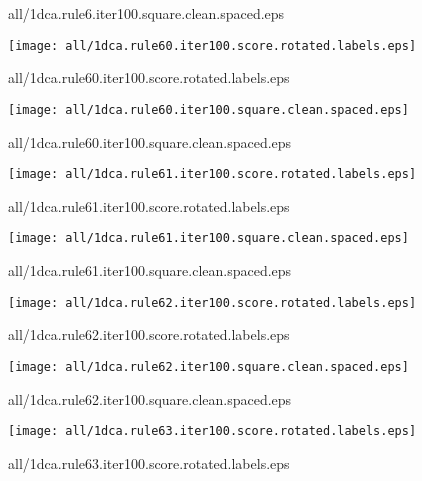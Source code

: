 \documentclass{article}
\begin{document}
{\footnotesize all/1dca.rule6.iter100.square.clean.spaced.eps}
\begin{center}
\begin{minipage}{\textwidth}
\texttt{[image: all/1dca.rule60.iter100.score.rotated.labels.eps]}
\end{minipage}
\end{center}
{\footnotesize all/1dca.rule60.iter100.score.rotated.labels.eps}
\begin{center}
\begin{minipage}{\textwidth}
\texttt{[image: all/1dca.rule60.iter100.square.clean.spaced.eps]}
\end{minipage}
\end{center}
{\footnotesize all/1dca.rule60.iter100.square.clean.spaced.eps}
\begin{center}
\begin{minipage}{\textwidth}
\texttt{[image: all/1dca.rule61.iter100.score.rotated.labels.eps]}
\end{minipage}
\end{center}
{\footnotesize all/1dca.rule61.iter100.score.rotated.labels.eps}
\begin{center}
\begin{minipage}{\textwidth}
\texttt{[image: all/1dca.rule61.iter100.square.clean.spaced.eps]}
\end{minipage}
\end{center}
{\footnotesize all/1dca.rule61.iter100.square.clean.spaced.eps}
\begin{center}
\begin{minipage}{\textwidth}
\texttt{[image: all/1dca.rule62.iter100.score.rotated.labels.eps]}
\end{minipage}
\end{center}
{\footnotesize all/1dca.rule62.iter100.score.rotated.labels.eps}
\begin{center}
\begin{minipage}{\textwidth}
\texttt{[image: all/1dca.rule62.iter100.square.clean.spaced.eps]}
\end{minipage}
\end{center}
{\footnotesize all/1dca.rule62.iter100.square.clean.spaced.eps}
\begin{center}
\begin{minipage}{\textwidth}
\texttt{[image: all/1dca.rule63.iter100.score.rotated.labels.eps]}
\end{minipage}
\end{center}
{\footnotesize all/1dca.rule63.iter100.score.rotated.labels.eps}
\end{document}
